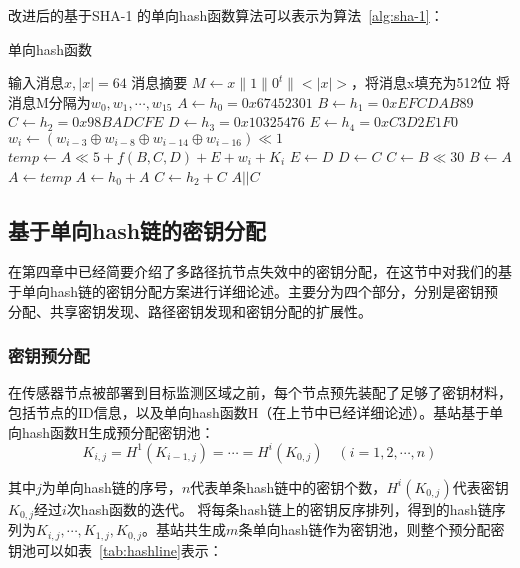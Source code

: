 改进后的基于SHA-1 的单向hash函数算法可以表示为算法~\ref{alg:sha-1}：
\begin{algorithm}[htbp]
  \caption{单向hash函数}
  \label{alg:sha-1}
  \begin{algorithmic}[1]
    \REQUIRE 输入消息$x,|x|=64$
    \ENSURE 消息摘要
    \STATE $M \leftarrow x\| 1\| 0^t\| <|x|>$，将消息x填充为512位
    \STATE 将消息M分隔为$w_0,w_1,\cdots,w_{15}$
    \STATE $A \leftarrow h_0 = 0x67452301$
    \STATE $B \leftarrow h_1 = 0xEFCDAB89$
    \STATE $C \leftarrow h_2 = 0x98BADCFE$
    \STATE $D \leftarrow h_3 = 0x10325476$
    \STATE $E \leftarrow h_4 = 0xC3D2E1F0$
        \STATE $w_i \leftarrow (w_{i-3}\oplus w_{i-8}\oplus w_{i-14}\oplus w_{i-16})\ll 1$
    \ENDFOR
        \STATE $temp \leftarrow A\ll 5 + f(B,C,D)+E+w_i+K_i$
        \STATE $E \leftarrow D$
        \STATE $D \leftarrow C$
        \STATE $C \leftarrow B\ll 30$
        \STATE $B \leftarrow A$
        \STATE $A \leftarrow temp$
    \ENDFOR
    \STATE $A \leftarrow h_0+A$
    \STATE $C \leftarrow h_2+C$
    \RETURN $A||C$
  \end{algorithmic}
\end{algorithm}

\subsection{基于单向hash链的密钥分配}
在第四章中已经简要介绍了多路径抗节点失效中的密钥分配，在这节中对我们的基于单向hash链的密钥分配方案进行详细论述。主要分为四个部分，分别是密钥预分配、共享密钥发现、路径密钥发现和密钥分配的扩展性。
\subsubsection{密钥预分配}
在传感器节点被部署到目标监测区域之前，每个节点预先装配了足够了密钥材料，包括节点的ID信息，以及单向hash函数H（在上节中已经详细论述）。基站基于单向hash函数H生成预分配密钥池：
\begin{equation}
  K_{i,j}=H^{1}(K_{i-1,j})=\cdots=H^{i}(K_{0,j})\quad (i=1,2,\cdots,n)
\end{equation}

其中$j$为单向hash链的序号，$n$代表单条hash链中的密钥个数，$H^{i}(K_{0,j})$代表密钥$K_{0,j}$经过$i$次hash函数的迭代。
将每条hash链上的密钥反序排列，得到的hash链序列为$K_{i,j},\cdots,K_{1,j},K_{0,j}$。基站共生成$m$条单向hash链作为密钥池，则整个预分配密钥池可以如表~\ref{tab:hashline}表示：

